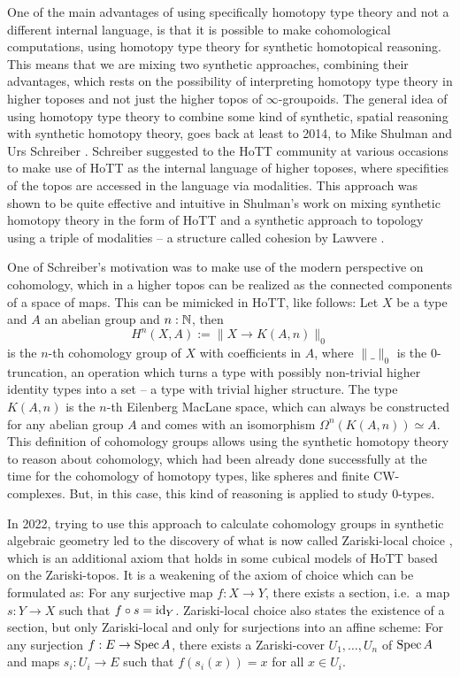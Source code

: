 One of the main advantages of using specifically homotopy type theory and not a different internal language,
is that it is possible to make cohomological computations, using homotopy type theory for synthetic homotopical reasoning.
This means that we are mixing two synthetic approaches, combining their advantages,
which rests on the possibility of interpreting homotopy type theory in higher toposes \cite{shulman2019all} and not just the higher topos of $\infty$-groupoids.
The general idea of using homotopy type theory to combine some kind of synthetic, spatial reasoning with synthetic homotopy theory, goes back at least to 2014, to Mike Shulman and Urs Schreiber \cite{Schreiber_2014}.
Schreiber suggested to the HoTT community at various occasions to make use of HoTT as the internal language of higher toposes, where specifities of the topos are accessed in the language via modalities.
This approach was shown to be quite effective and intuitive in Shulman's \cite{shulman-Brouwer-fixed-point} work on mixing synthetic homotopy theory in the form of HoTT and a synthetic approach to topology using a triple of modalities -- a structure called cohesion by Lawvere \cite{Lawvere2007}.

One of Schreiber's motivation was to make use of the modern perspective on cohomology, which in a higher topos can be realized as the connected components of a space of maps. This can be mimicked in HoTT, like follows: Let $X$ be a type and $A$ an abelian group and $n:\mathbb{N}$, then
\[ H^n(X,A):=\| X\to K(A,n) \|_0\]
is the $n$-th cohomology group of $X$ with coefficients in $A$, where $\|\_\|_0$ is the $0$-truncation, an operation which turns a type with possibly non-trivial higher identity types into a set -- a type with trivial higher structure. The type $K(A,n)$ is the $n$-th Eilenberg MacLane space, which can always be constructed for any abelian group $A$ and comes with an isomorphism $\Omega^n(K(A,n))\simeq A$.
This definition of cohomology groups allows using the synthetic homotopy theory to reason about cohomology, which had been already done successfully at the time for the cohomology of homotopy types, like spheres and finite CW-complexes. But, in this case, this kind of reasoning is applied to study $0$-types.

In 2022, trying to use this approach to calculate cohomology groups in synthetic algebraic geometry led to the discovery of what is now called Zariski-local choice \cite{draft},
which is an additional axiom that holds in some cubical models of HoTT based on the Zariski-topos.
It is a weakening of the axiom of choice which can be formulated as: For any surjective map $f:X\to Y$, there exists a section, i.e.\ a map $s:Y\to X$ such that $f\circ s=\mathrm{id}_Y$.
Zariski-local choice also states the existence of a section, but only Zariski-local and only for surjections into an affine scheme: For any surjection $f:E\to \operatorname{Spec} A$,
there exists a Zariski-cover $U_1,\dots,U_n$ of $\operatorname{Spec} A$ and maps $s_i:U_i\to E$ such that $f(s_i(x))=x$ for all $x\in U_i$.

